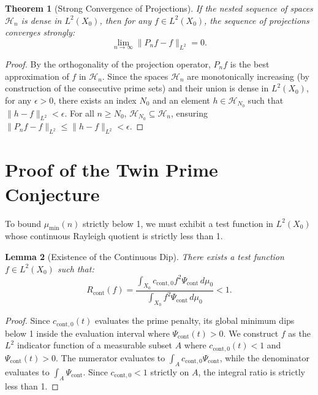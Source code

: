 \documentclass{aomart}
\newtheorem{theorem}{Theorem}[section]
\newtheorem{lemma}[theorem]{Lemma}
\theoremstyle{definition}
\begin{document}
\begin{theorem}[Strong Convergence of Projections] \label{thm:strong_convergence}
If the nested sequence of spaces $\mathcal{H}_n$ is dense in $L^2(X_0)$, then for any
$f \in L^2(X_0)$, the sequence of projections converges strongly:
\[ \lim_{n \to \infty} \| P_n f - f \|_{L^2} = 0. \]
\end{theorem}
\begin{proof}
By the orthogonality of the projection operator, $P_n f$ is the best approximation of $f$ in
$\mathcal{H}_n$. Since the spaces $\mathcal{H}_n$ are monotonically increasing (by construction of
the consecutive prime sets) and their union is dense in $L^2(X_0)$, for any $\epsilon > 0$, there
exists an index $N_0$ and an element $h \in \mathcal{H}_{N_0}$ such that $\|h - f\|_{L^2} < \epsilon$.
For all $n \ge N_0$, $\mathcal{H}_{N_0} \subseteq \mathcal{H}_n$, ensuring $\|P_n f - f\|_{L^2} \le
\|h - f\|_{L^2} < \epsilon$.
\end{proof}

\section{Proof of the Twin Prime Conjecture} \label{sec:main}

To bound $\mu_{\min}(n)$ strictly below 1, we must exhibit a test function in $L^2(X_0)$ whose
continuous Rayleigh quotient is strictly less than 1.

\begin{lemma}[Existence of the Continuous Dip] \label{lem:dip}
There exists a test function $f \in L^2(X_0)$ such that:
\[ R_{\text{cont}}(f) = \frac{\int_{X_0} c_{\text{cont}, 0} f^2 \Psi_{\text{cont}} \, d\mu_0}{\int_{X_0} f^2 \Psi_{\text{cont}} \, d\mu_0} < 1. \]
\end{lemma}
\begin{proof}
Since $c_{\text{cont}, 0}(t)$ evaluates the prime penalty, its global minimum dips below 1 inside
the evaluation interval where $\Psi_{\text{cont}}(t) > 0$. We construct $f$ as the $L^2$ indicator
function of a measurable subset $A$ where $c_{\text{cont}, 0}(t) < 1$ and $\Psi_{\text{cont}}(t) > 0$.
The numerator evaluates to $\int_A c_{\text{cont}, 0} \Psi_{\text{cont}}$, while the denominator
evaluates to $\int_A \Psi_{\text{cont}}$. Since $c_{\text{cont}, 0} < 1$ strictly on $A$, the
integral ratio is strictly less than 1.
\end{proof}
\end{document}
